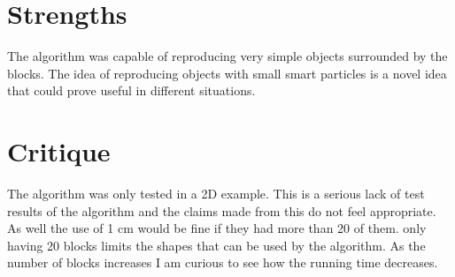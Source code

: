 \documentclass{article}
\begin{document}
\section*{Strengths}
The algorithm was capable of reproducing very simple objects surrounded by the blocks. The idea of reproducing objects with small smart particles is a novel idea that could prove useful in different situations.
\section*{Critique}
The algorithm was only tested in a 2D example. This is a serious lack of test results of the algorithm and the claims made from this do not feel appropriate. As well the use of 1 cm would be fine if they had more than 20 of them. only having 20 blocks limits the shapes that can be used by the algorithm. As the number of blocks increases I am curious to see how the running time decreases.
\end{document}
